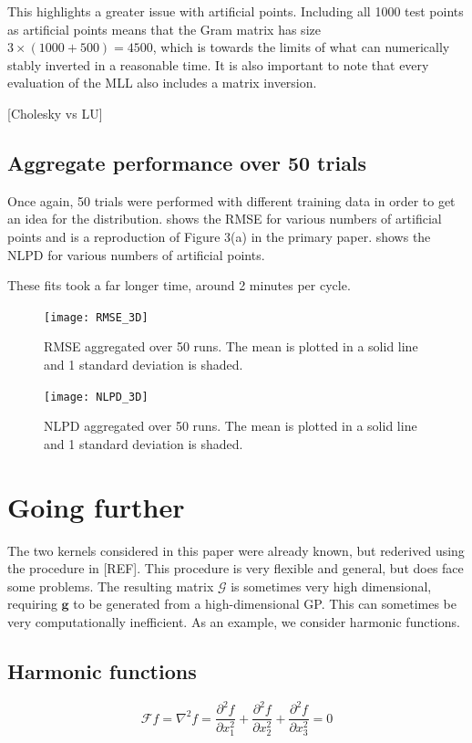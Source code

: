 \documentclass[12pt,a4paper,twoside]{report}
\theoremstyle{definition}
\begin{document}
This highlights a greater issue with artificial points. Including all 1000 test points as artificial points means that the Gram matrix has size $3 \times (1000 + 500)=4500$, which is towards the limits of what can numerically stably inverted in a reasonable time. It is also important to note that every evaluation of the MLL also includes a matrix inversion.

[Cholesky vs LU]

\subsection{Aggregate performance over 50 trials}

Once again, 50 trials were performed with different training data in order to get an idea for the distribution.  shows the RMSE for various numbers of artificial points and is a reproduction of Figure 3(a) in the primary paper.  shows the NLPD for various numbers of artificial points.

These fits took a far longer time, around 2 minutes per cycle.
 
\begin{figure}[ht]
	\centering
	\texttt{[image: RMSE\_3D]}
	\caption{RMSE aggregated over 50 runs. The mean is plotted in a solid line and 1 standard deviation is shaded.}
	\label{rmse3d}
\end{figure}

\begin{figure}[ht]
	\centering
	\texttt{[image: NLPD\_3D]}
	\caption{NLPD aggregated over 50 runs. The mean is plotted in a solid line and 1 standard deviation is shaded.}
	\label{nlpd3d}
\end{figure}

\section{Going further}
The two kernels considered in this paper were already known, but rederived using the procedure in [REF]. This procedure is very flexible and general, but does face some problems. The resulting matrix $\mathscr G$ is sometimes very high dimensional, requiring $\mathbf g$ to be generated from a high-dimensional GP. This can sometimes be very computationally inefficient. As an example, we consider harmonic functions.

\subsection{Harmonic functions}
\begin{equation*}
	\mathscr F f = \nabla^2 f= \frac{\partial ^2f}{\partial x_1^2} + \frac{\partial ^2f}{\partial x_2^2}+\frac{\partial ^2f}{\partial x_3^2} =0
\end{equation*}
\end{document}
